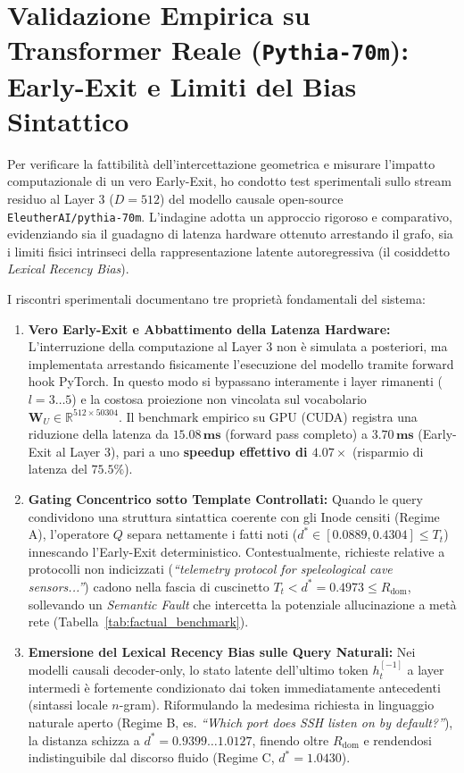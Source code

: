 \documentclass[11pt,a4paper]{article}
\theoremstyle{definition}
\begin{document}
\section{Validazione Empirica su Transformer Reale (\texttt{Pythia-70m}): Early-Exit e Limiti del Bias Sintattico}

Per verificare la fattibilità dell'intercettazione geometrica e misurare l'impatto computazionale di un vero Early-Exit, ho condotto test sperimentali sullo stream residuo al Layer 3 ($D=512$) del modello causale open-source \texttt{EleutherAI/pythia-70m}. L'indagine adotta un approccio rigoroso e comparativo, evidenziando sia il guadagno di latenza hardware ottenuto arrestando il grafo, sia i limiti fisici intrinseci della rappresentazione latente autoregressiva (il cosiddetto \textit{Lexical Recency Bias}).

I riscontri sperimentali documentano tre proprietà fondamentali del sistema:

\begin{enumerate}[leftmargin=*, itemsep=2.5pt]
    \item \textbf{Vero Early-Exit e Abbattimento della Latenza Hardware:} L'interruzione della computazione al Layer 3 non è simulata a posteriori, ma implementata arrestando fisicamente l'esecuzione del modello tramite forward hook PyTorch. In questo modo si bypassano interamente i layer rimanenti ($l=3 \dots 5$) e la costosa proiezione non vincolata sul vocabolario $\mathbf{W}_U \in \mathbb{R}^{512 \times 50304}$. Il benchmark empirico su GPU (CUDA) registra una riduzione della latenza da $\mathbf{15.08\,\text{ms}}$ (forward pass completo) a $\mathbf{3.70\,\text{ms}}$ (Early-Exit al Layer 3), pari a uno \textbf{speedup effettivo di $4.07\times$} (risparmio di latenza del $\mathbf{75.5\%}$).
    \item \textbf{Gating Concentrico sotto Template Controllati:} Quando le query condividono una struttura sintattica coerente con gli Inode censiti (Regime A), l'operatore $Q$ separa nettamente i fatti noti ($d^* \in [0.0889, 0.4304] \le T_t$) innescando l'Early-Exit deterministico. Contestualmente, richieste relative a protocolli non indicizzati (\textit{``telemetry protocol for speleological cave sensors...''}) cadono nella fascia di cuscinetto $T_t < d^* = 0.4973 \le R_{\mathrm{dom}}$, sollevando un \textit{Semantic Fault} che intercetta la potenziale allucinazione a metà rete (Tabella~\ref{tab:factual_benchmark}).
    \item \textbf{Emersione del Lexical Recency Bias sulle Query Naturali:} Nei modelli causali decoder-only, lo stato latente dell'ultimo token $h_t^{[-1]}$ a layer intermedi è fortemente condizionato dai token immediatamente antecedenti (sintassi locale $n$-gram). Riformulando la medesima richiesta in linguaggio naturale aperto (Regime B, es. \textit{``Which port does SSH listen on by default?''}), la distanza schizza a $d^* = 0.9399 \dots 1.0127$, finendo oltre $R_{\mathrm{dom}}$ e rendendosi indistinguibile dal discorso fluido (Regime C, $d^* = 1.0430$).
\end{enumerate}
\end{document}
